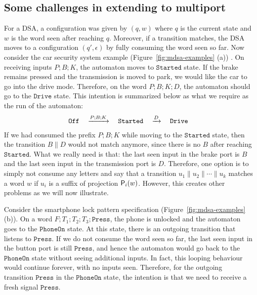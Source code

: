 \subsection{Some challenges in extending to multiport}
\label{sec:challenges}

For a DSA, a configuration was given by $(q, w)$ where $q$ is the current state and $w$ is the word seen after reaching $q$. Moreover, if a transition matches, the DSA moves to a configuration $(q', \epsilon)$ by fully consuming the word seen so far. Now consider the car security system example (Figure~\ref{fig:mdsa-examples} (a)) . On receiving inputs $P;B;K$, the automaton moves to $\mathtt{Started}$ state.
If the brake remains pressed and the transmission is moved to park, we would like the car to go into the drive mode. Therefore, on the word $P;B;K;D$, the automaton should go to the $\mathtt{Drive}$ state. This intention is summarized below as what we require as the run of the automaton:
\begin{align*}
  \mathtt{Off} \quad \xrightarrow{P;B;K} \quad \mathtt{Started} \quad \xrightarrow{D} \quad \mathtt{Drive}
  \end{align*} 
 If we had consumed the prefix $P;B;K$ while moving to the $\mathtt{Started}$ state, then the transition $B \parallel D$ would not match anymore, since there is no $B$ after reaching $\mathtt{Started}$. What we really need is that: the last seen input in the brake port is $B$ and the last seen input in the transmission port is $D$. Therefore, one option is to simply not consume any letters and say that a transition $u_1 \parallel u_2 \parallel \cdots \parallel u_k$ matches a word $w$ if $u_i$ is a suffix of projection $\mathsf{P}_{i}(w)$. However, this creates other problems as we will now illustrate. 
 
 Consider the smartphone lock pattern specification (Figure~\ref{fig:mdsa-examples} (b)). On a word $F; T_1; T_2; T_3; \mathtt{Press}$, the phone is unlocked and the automaton goes to the $\mathtt{PhoneOn}$ state. At this state, there is an outgoing transition that listens to $\mathtt{Press}$. If we do not consume the word seen so far, the last seen input in the button port is still $\mathtt{Press}$, and hence the automaton would go back to the $\mathtt{PhoneOn}$ state without seeing additional inputs. In fact, this looping behaviour would continue forever, with no inputs seen. Therefore, for the outgoing transition $\mathtt{Press}$ in the $\mathtt{PhoneOn}$ state, the intention is that we need to receive a fresh signal $\mathtt{Press}$.  
 

